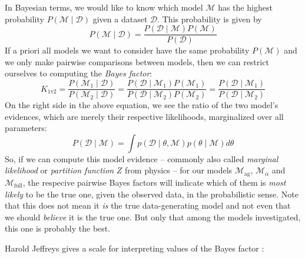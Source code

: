 \documentclass[\relativeRoot/main.tex]{subfiles}
\begin{document}
In Bayesian terms, we would like to know which model $\mathcal{M}$ has the highest probability $P\left( \mathcal{M} \mid \boldsymbol{\mathcal{D}} \right)$ given a dataset $\boldsymbol{\mathcal{D}}$. This probability is given by
%
\begin{equation}
    P\left( \mathcal{M} \mid \boldsymbol{\mathcal{D}} \right) = \frac{P\left( \boldsymbol{\mathcal{D}} \mid \mathcal{M} \right) P\left( \mathcal{M} \right)}{P \left( \boldsymbol{\mathcal{D}} \right)}
\end{equation}
%
If a priori all models we want to consider have the same probability $P \left( \mathcal{M} \right)$ and we only make pairwise comparisons between models, then we can restrict ourselves to computing the \emph{Bayes factor}:
%
\begin{equation}
    K_\text{1v2} = \frac{P\left( \mathcal{M}_1 \mid \boldsymbol{\mathcal{D}} \right)}{P\left( \mathcal{M}_2 \mid \boldsymbol{\mathcal{D}} \right)} = \frac{P\left( \boldsymbol{\mathcal{D}} \mid \mathcal{M}_1 \right) P\left( \mathcal{M}_1 \right)}{P\left( \boldsymbol{\mathcal{D}} \mid \mathcal{M}_2 \right) P\left( \mathcal{M}_2 \right)} = \frac{P\left( \boldsymbol{\mathcal{D}} \mid \mathcal{M}_1 \right)}{P\left( \boldsymbol{\mathcal{D}} \mid \mathcal{M}_2 \right)}
\end{equation}
%
On the right side in the above equation, we see the ratio of the two model's evidences, which are merely their respective likelihoods, marginalized over all parameters:
%
\begin{equation} \label{eq:bilateral:evidence}
    P\left( \boldsymbol{\mathcal{D}} \mid \mathcal{M} \right) = \int{ p\left( \boldsymbol{\mathcal{D}} \mid \theta, \mathcal{M} \right) p(\theta \mid \mathcal{M}) d\theta}
\end{equation}
%
So, if we can compute this model evidence -- commonly also called \emph{marginal likelihood} or \emph{partition function} $Z$ from physics -- for our models $\mathcal{M}_\text{ag}$, $\mathcal{M}_\alpha$ and $\mathcal{M}_\text{full}$, the respecive pairwise Bayes factors will indicate which of them is \emph{most likely} to be the true one, given the observed data, in the probabilistic sense. Note that this does not mean it \emph{is} the true data-generating model and not even that we should \emph{believe} it is the true one. But only that among the models investigated, this one is probably the best.

Harold Jeffreys gives a scale for interpreting values of the Bayes factor \cite{jeffreys_theory_1998}:
\end{document}
